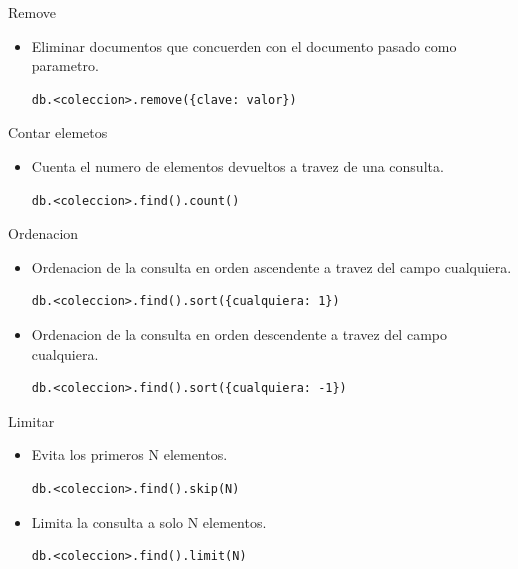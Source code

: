 \documentclass[12pt]{beamer}
\begin{document}
\begin{frame}[fragile]{Remove}

  \begin{itemize}
    \item Eliminar documentos que concuerden con el documento pasado como parametro.

    \begin{verbatim}
db.<coleccion>.remove({clave: valor})
    \end{verbatim}
  \end{itemize}
\end{frame}

\begin{frame}[fragile]{Contar elemetos}

  \begin{itemize}
    \item Cuenta el numero de elementos devueltos a travez de una consulta.

    \begin{verbatim}
db.<coleccion>.find().count()
    \end{verbatim}
  \end{itemize}
\end{frame}

\begin{frame}[fragile]{Ordenacion}

  \begin{itemize}
    \item Ordenacion de la consulta en orden ascendente a travez del campo cualquiera.

    \begin{verbatim}
db.<coleccion>.find().sort({cualquiera: 1})
    \end{verbatim}

    \item Ordenacion de la consulta en orden descendente a travez del campo cualquiera.

    \begin{verbatim}
db.<coleccion>.find().sort({cualquiera: -1})
    \end{verbatim}

  \end{itemize}
\end{frame}

\begin{frame}[fragile]{Limitar}
  \begin{itemize}
    \item Evita los primeros N elementos.

    \begin{verbatim}
db.<coleccion>.find().skip(N)
    \end{verbatim}

    \item Limita la consulta a solo N elementos.

    \begin{verbatim}
db.<coleccion>.find().limit(N)
    \end{verbatim}

  \end{itemize}
\end{frame}
\end{document}
